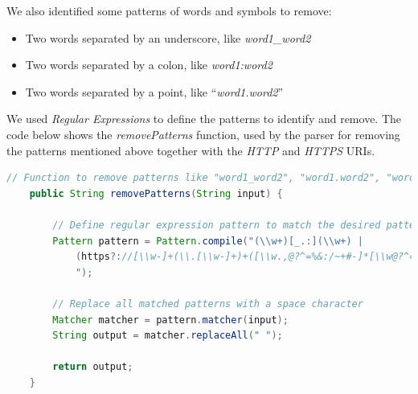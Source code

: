 \newpage
We also identified some patterns of words and symbols to remove:
\begin{itemize}
\item Two words separated by an underscore, like \textit{word1\_word2}
\item Two words separated by a colon, like \textit{word1:word2}
\item Two words separated by a point, like ``\textit{word1.word2}''
\end{itemize}
We used \textit{Regular Expressions} \cite{regexdefinition} to define the patterns to identify and remove. 
The code below shows the \textit{removePatterns} function, used by the parser for removing the patterns mentioned above together with the \textit{HTTP} and \textit{HTTPS} URIs.
\begin{lstlisting}[language=Java]
    // Function to remove patterns like "word1_word2", "word1.word2", "word1.word2", and HTTP/HTTPS URIs from a string
    public String removePatterns(String input) {

        // Define regular expression pattern to match the desired patterns
        Pattern pattern = Pattern.compile("(\\w+)[_.:](\\w+) |
            (https?://[\\w-]+(\\.[\\w-]+)+([\\w.,@?^=%&:/~+#-]*[\\w@?^=%&/~+#-])?)
            ");
            
        // Replace all matched patterns with a space character
        Matcher matcher = pattern.matcher(input);
        String output = matcher.replaceAll(" ");

        return output;
    }
\end{lstlisting}

